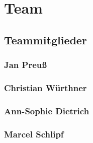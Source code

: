 \chapter{Team}

\section{Teammitglieder}

\subsection*{Jan Preuß}

\subsection*{Christian Würthner}

\subsection*{Ann-Sophie Dietrich}

\subsection*{Marcel Schlipf}